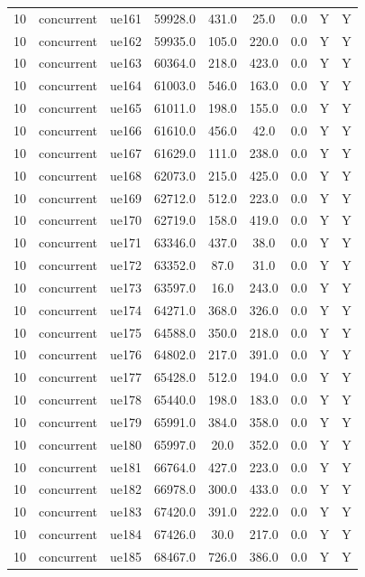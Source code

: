 \begin{table}[ht]
\begin{tabular}{|c|c|c|c|c|c|c|c|c|}
10 & concurrent & ue161 & 59928.0 & 431.0 & 25.0 & 0.0 & Y & Y \\
10 & concurrent & ue162 & 59935.0 & 105.0 & 220.0 & 0.0 & Y & Y \\
10 & concurrent & ue163 & 60364.0 & 218.0 & 423.0 & 0.0 & Y & Y \\
10 & concurrent & ue164 & 61003.0 & 546.0 & 163.0 & 0.0 & Y & Y \\
10 & concurrent & ue165 & 61011.0 & 198.0 & 155.0 & 0.0 & Y & Y \\
10 & concurrent & ue166 & 61610.0 & 456.0 & 42.0 & 0.0 & Y & Y \\
10 & concurrent & ue167 & 61629.0 & 111.0 & 238.0 & 0.0 & Y & Y \\
10 & concurrent & ue168 & 62073.0 & 215.0 & 425.0 & 0.0 & Y & Y \\
10 & concurrent & ue169 & 62712.0 & 512.0 & 223.0 & 0.0 & Y & Y \\
10 & concurrent & ue170 & 62719.0 & 158.0 & 419.0 & 0.0 & Y & Y \\
10 & concurrent & ue171 & 63346.0 & 437.0 & 38.0 & 0.0 & Y & Y \\
10 & concurrent & ue172 & 63352.0 & 87.0 & 31.0 & 0.0 & Y & Y \\
10 & concurrent & ue173 & 63597.0 & 16.0 & 243.0 & 0.0 & Y & Y \\
10 & concurrent & ue174 & 64271.0 & 368.0 & 326.0 & 0.0 & Y & Y \\
10 & concurrent & ue175 & 64588.0 & 350.0 & 218.0 & 0.0 & Y & Y \\
10 & concurrent & ue176 & 64802.0 & 217.0 & 391.0 & 0.0 & Y & Y \\
10 & concurrent & ue177 & 65428.0 & 512.0 & 194.0 & 0.0 & Y & Y \\
10 & concurrent & ue178 & 65440.0 & 198.0 & 183.0 & 0.0 & Y & Y \\
10 & concurrent & ue179 & 65991.0 & 384.0 & 358.0 & 0.0 & Y & Y \\
10 & concurrent & ue180 & 65997.0 & 20.0 & 352.0 & 0.0 & Y & Y \\
10 & concurrent & ue181 & 66764.0 & 427.0 & 223.0 & 0.0 & Y & Y \\
10 & concurrent & ue182 & 66978.0 & 300.0 & 433.0 & 0.0 & Y & Y \\
10 & concurrent & ue183 & 67420.0 & 391.0 & 222.0 & 0.0 & Y & Y \\
10 & concurrent & ue184 & 67426.0 & 30.0 & 217.0 & 0.0 & Y & Y \\
10 & concurrent & ue185 & 68467.0 & 726.0 & 386.0 & 0.0 & Y & Y \\

\end{tabular}
\end{table}
